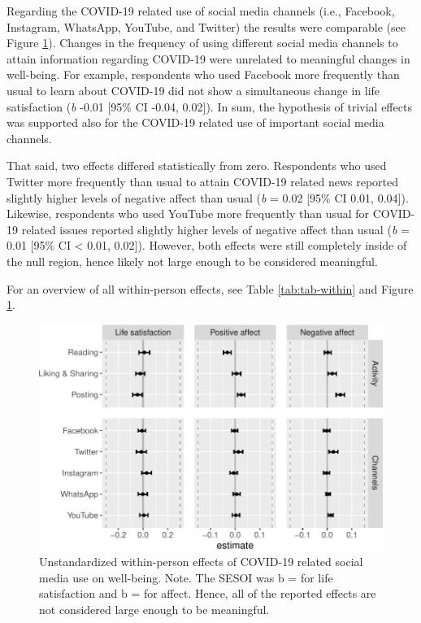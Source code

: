 \documentclass[
  man,mask,floatsintext]{apa7}
\begin{document}
Regarding the COVID-19 related use of social media channels (i.e., Facebook, Instagram, WhatsApp, YouTube, and Twitter) the results were comparable (see Figure \ref{fig:fig-within}).
Changes in the frequency of using different social media channels to attain information regarding COVID-19 were unrelated to meaningful changes in well-being.
For example, respondents who used Facebook more frequently than usual to learn about COVID-19 did not show a simultaneous change in life satisfaction (\emph{b} -0.01 {[}95\% CI -0.04, 0.02{]}).
In sum, the hypothesis of trivial effects was supported also for the COVID-19 related use of important social media channels.

That said, two effects differed statistically from zero.
Respondents who used Twitter more frequently than usual to attain COVID-19 related news reported slightly higher levels of negative affect than usual (\emph{b} = 0.02 {[}95\% CI 0.01, 0.04{]}).
Likewise, respondents who used YouTube more frequently than usual for COVID-19 related issues reported slightly higher levels of negative affect than usual (\emph{b} = 0.01 {[}95\% CI \textless{} 0.01, 0.02{]}).
However, both effects were still completely inside of the null region, hence likely not large enough to be considered meaningful.

For an overview of all within-person effects, see Table \ref{tab:tab-within} and Figure \ref{fig:fig-within}.

\begin{figure}
\centering
\includegraphics{manuscript_files/figure-latex/fig-within-1.pdf}
\caption{\label{fig:fig-within}Unstandardized within-person effects of COVID-19 related social media use on well-being. Note. The SESOI was b = \textbar{} for life satisfaction and b = \textbar{} for affect. Hence, all of the reported effects are not considered large enough to be meaningful.}
\end{figure}
\end{document}
